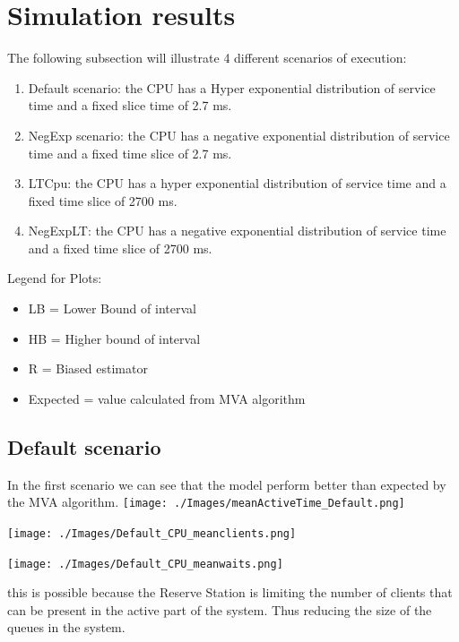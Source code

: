 \documentclass[12pt,a4paper]{article}
\begin{document}
\section{Simulation results}
The following subsection will illustrate 4 different scenarios of execution:
\begin{enumerate}
    \item Default scenario: the CPU has a Hyper exponential distribution of service time and a fixed slice time of 2.7 ms.
    \item NegExp scenario: the CPU has a negative exponential distribution of service time and a fixed time slice of 2.7 ms.
    \item LTCpu: the CPU has a hyper exponential distribution of service time and a fixed time slice of 2700 ms.
    \item NegExpLT: the CPU has a negative exponential distribution of service time and a fixed time slice of 2700 ms.
\end{enumerate}
Legend for Plots:
\begin{itemize}
    \item LB = Lower Bound of interval 
    \item HB = Higher bound of interval 
    \item R = Biased estimator 
    \item Expected = value calculated from MVA algorithm
\end{itemize}

\subsection{Default scenario}
In the first scenario we can see that the model perform better than expected by the MVA algorithm.
\texttt{[image: ./Images/meanActiveTime\_Default.png]}

\texttt{[image: ./Images/Default\_CPU\_meanclients.png]}

\texttt{[image: ./Images/Default\_CPU\_meanwaits.png]}

this is possible because the Reserve Station is limiting the number of clients that can be present in the active part of the system. Thus reducing the size of the queues in the system.
\end{document}

